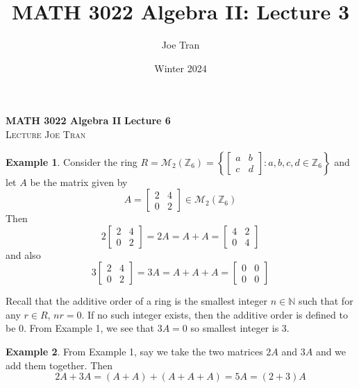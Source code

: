 \documentclass[11pt]{article}
\title{MATH 3022 Algebra II: Lecture 3}
\author{Joe Tran}
\date{Winter 2024}
\theoremstyle{definition}\newtheorem{definition}{Definition}
\theoremstyle{definition}\newtheorem*{notation}{Notation}
\theoremstyle{definition}\newtheorem{example}{Example}
\theoremstyle{theorem}\newtheorem{theorem}{Theorem}
\theoremstyle{theorem}\newtheorem{corollary}{Corollary}
\theoremstyle{theorem}\newtheorem{proposition}{Proposition}
\theoremstyle{theorem}\newtheorem{lemma}{Lemma}
\theoremstyle{theorem}\newtheorem{question}{Question}
\theoremstyle{remark}\newtheorem{remark}{Remark}
\newcommand{\Z}{\mathbb{Z}}
\newcommand{\N}{\mathbb{N}}
\newcommand{\M}{\mathcal{M}}
\begin{document}
\textbf{MATH 3022 Algebra II} \hfill \textbf{Lecture 6} \\
\textsc{Lecture} \hfill \textsc{Joe Tran}

\begin{example}
    Consider the ring $R = \M_2(\Z_6) = \left\{\begin{bmatrix} a & b \\ c & d \end{bmatrix} : a, b, c, d \in \Z_6\right\}$ and let $A$ be the matrix given by
    \begin{equation*}
        A = \begin{bmatrix} 2 & 4 \\ 0 & 2 \end{bmatrix} \in \M_2(\Z_6)
    \end{equation*}
    Then
    \begin{equation*}
        2\begin{bmatrix} 2 & 4 \\ 0 & 2 \end{bmatrix} = 2A = A + A = \begin{bmatrix} 4 & 2 \\ 0 & 4 \end{bmatrix}
    \end{equation*}
    and also
    \begin{equation*}
        3\begin{bmatrix} 2 & 4 \\ 0 & 2 \end{bmatrix} = 3A = A + A + A = \begin{bmatrix} 0 & 0 \\ 0 & 0 \end{bmatrix}
    \end{equation*}
\end{example}

Recall that the additive order of a ring is the smallest integer $n \in \N$ such that for any $r \in R$, $nr = 0$. If no such integer exists, then the additive order is defined to be 0. From Example 1, we see that $3A = 0$ so smallest integer is 3.

\begin{example}
    From Example 1, say we take the two matrices $2A$ and $3A$ and we add them together. Then
    \begin{equation*}
        2A + 3A = (A + A) + (A + A + A) = 5A = (2 + 3)A
    \end{equation*}
\end{example}
\end{document}
